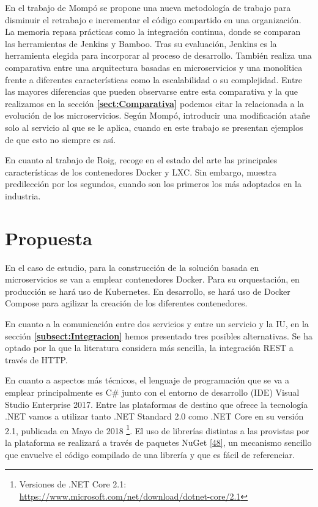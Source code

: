 \documentclass[11pt,spanish,listoffigures]{tfgetsinf}
\begin{document}
En el trabajo de Mompó se propone una nueva metodología de trabajo para disminuir el retrabajo e incrementar el código compartido en una organización. La memoria repasa prácticas como la integración continua, donde se comparan las herramientas de Jenkins y Bamboo. Tras su evaluación, Jenkins es la herramienta elegida para incorporar al proceso de desarrollo. También realiza una comparativa entre una arquitectura basadas en microservicios y una monolítica frente a diferentes características como la escalabilidad o su complejidad. Entre las mayores diferencias que pueden observarse entre esta comparativa y la que realizamos en la sección \textbf{\ref{sect:Comparativa} } podemos citar la relacionada a la evolución de los microservicios. Según Mompó, introducir una modificación atañe solo al servicio al que se le aplica, cuando en este trabajo se presentan ejemplos de que esto no siempre es así.

En cuanto al trabajo de Roig, recoge en el estado del arte las principales características de los contenedores Docker y LXC. Sin embargo, muestra predilección por los segundos, cuando son los primeros los más adoptados en la industria.

\section{Propuesta} \label{sect:Propuesta}

En el caso de estudio, para la construcción de la solución basada en microservicios se van a emplear contenedores Docker. Para su orquestación, en producción se hará uso de Kubernetes. En desarrollo, se hará uso de Docker Compose para agilizar la creación de los diferentes contenedores. 

En cuanto a la comunicación entre dos servicios y entre un servicio y la IU, en la sección \textbf{\ref{subsect:Integracion} } hemos presentado tres posibles alternativas. Se ha optado por la que la literatura considera más sencilla, la integración REST a través de HTTP.

En cuanto a aspectos más técnicos, el lenguaje de programación que se va a emplear principalmente es C\# junto con el entorno de desarrollo (IDE) Visual Studio Enterprise 2017. Entre las plataformas de destino que ofrece la tecnología .NET vamos a utilizar tanto .NET Standard 2.0 como .NET Core en su versión 2.1, publicada en Mayo de 2018 \footnote{Versiones de .NET Core 2.1: \url{https://www.microsoft.com/net/download/dotnet-core/2.1}}. El uso de librerías distintas a las provistas por la plataforma se realizará a través de paquetes NuGet \hyperlink{page.80}{[48]}, un mecanismo sencillo que envuelve el código compilado de una librería y que es fácil de referenciar.
\end{document}
